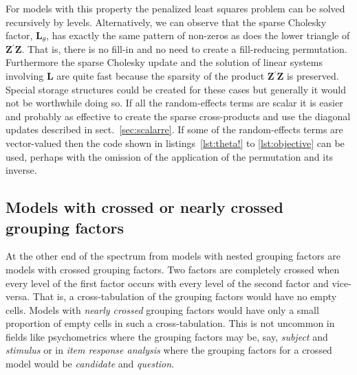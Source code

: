\documentclass{jss}
\newcommand{\trans}{\ensuremath{^\prime}}
\begin{document}
For models with this property the penalized least squares problem can
be solved recursively by levels.  Alternatively, we can observe that
the sparse Cholesky factor, $\bm L_\theta$, has exactly the same
pattern of non-zeros as does the lower triangle of $\bm Z\trans\bm Z$.
That is, there is no fill-in and no need to create a fill-reducing
permutation.  Furthermore the sparse Cholesky update and the solution
of linear systems involving $\bm L$ are quite fast because the
sparsity of the product $\bm Z\trans\bm Z$ is preserved.  Special
storage structures could be created for these cases but generally it
would not be worthwhile doing so.  If all the random-effects terms are
scalar it is easier and probably as effective to create the sparse
cross-products and use the diagonal updates described in
sect.~\ref{sec:scalarre}.  If some of the random-effects terms are
vector-valued then the code shown in listings~\ref{lst:theta!} to
\ref{lst:objective} can be used, perhaps with the omission of the
application of the permutation and its inverse.

\subsection{Models with crossed or nearly crossed grouping factors}
\label{sec:crossed}

At the other end of the spectrum from models with nested grouping
factors are models with crossed grouping factors.  Two factors are
completely crossed when every level of the first factor occurs with
every level of the second factor and vice-versa.  That is, a
cross-tabulation of the grouping factors would have no empty cells.
Models with \emph{nearly crossed} grouping factors would have only a
small proportion of empty cells in such a cross-tabulation.  This is
not uncommon in fields like psychometrics where the grouping factors
may be, say, \emph{subject} and \emph{stimulus} or in \emph{item
  response analysis} where the grouping factors for a crossed model
would be \emph{candidate} and \emph{question}.


\end{document}
